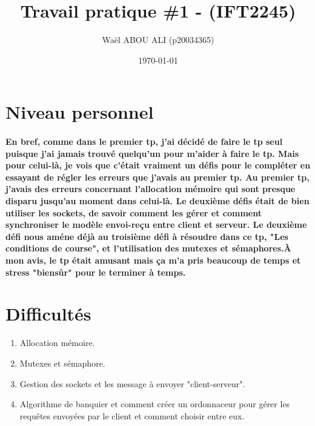 \documentclass{article}
\begin{document}
\title{Travail pratique \#1 - (IFT2245)} 

\author{Wa\"{e}l ABOU ALI (p20034365)}
\date{\today}

\begin{titlingpage}
\maketitle

\end{titlingpage}







\section{Niveau personnel}

\paragraph{En bref, comme dans le premier tp, j'ai décidé de faire le tp seul puisque j'ai jamais trouvé quelqu'un pour m'aider à faire le tp. Mais pour celui-là, je vois que c'était vraiment un défis pour le compléter en essayant de régler les erreurs que j'avais au premier tp. Au premier tp, j'avais des erreurs concernant l'allocation mémoire qui sont presque disparu jusqu'au moment dans celui-là. Le deuxième défis était de bien utiliser les sockets, de savoir comment les gérer et comment synchroniser le modèle envoi-reçu entre client et serveur. Le deuxième défi nous améne déjà au troisième défi à résoudre dans ce tp, "Les conditions de course", et l'utilisation des mutexes et sémaphores.\newline À mon avis, le tp était amusant mais ça m'a pris beaucoup de temps et stress "biensûr" pour le terminer à temps.}

\section{Difficultés}
\begin{enumerate}
\item Allocation mémoire.
\item Mutexes et sémaphore.
\item Gestion des sockets et les message à envoyer "client-serveur".
\item Algorithme de banquier et comment créer un ordonnaceur pour gérer les requêtes envoyées par le client et comment choisir entre eux.
\end{enumerate}
\end{document}
